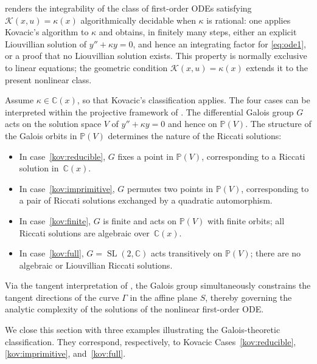 \documentclass[preprint,a4paper]{elsarticle}
\begin{document}
\begin{remark}\label{rem:decidability}
 renders the integrability of the class of first-order ODEs satisfying $\mathcal{K}(x,u)=\kappa(x)$ algorithmically decidable when $\kappa$ is rational: one applies Kovacic's algorithm to $\kappa$ and obtains, in finitely many steps, either an explicit Liouvillian solution of $y''+\kappa y=0$, and hence an integrating factor for \eqref{eq:ode1}, or a proof that no Liouvillian solution exists. This property is normally exclusive to linear equations; the geometric condition $\mathcal{K}(x,u)=\kappa(x)$ extends it to the present nonlinear class.
\end{remark}


\begin{remark}\label{rem:galois_projective}
Assume $\kappa\in\mathbb{C}(x)$, so that Kovacic's classification applies.
The four cases can be interpreted within the projective framework of . The differential Galois group $G$ acts on the solution space $V$ of $y''+\kappa y=0$ and hence on $\mathbb{P}(V)$. The structure of the Galois orbits in $\mathbb{P}(V)$ determines the nature of the Riccati solutions:
\begin{itemize}
\item In case~\ref{kov:reducible}, $G$ fixes a point in $\mathbb{P}(V)$, corresponding to a Riccati solution in~$\mathbb{C}(x)$.
\item In case~\ref{kov:imprimitive}, $G$ permutes two points in $\mathbb{P}(V)$, corresponding to a pair of Riccati solutions exchanged by a quadratic automorphism.
\item In case~\ref{kov:finite}, $G$ is finite and acts on $\mathbb{P}(V)$ with finite orbits; all Riccati solutions are algebraic over~$\mathbb{C}(x)$.
\item In case~\ref{kov:full}, $G=\operatorname{SL}(2,\mathbb{C})$ acts transitively on $\mathbb{P}(V)$; there are no algebraic or Liouvillian Riccati solutions.
\end{itemize}
Via the tangent interpretation of , the Galois group simultaneously constrains the tangent directions of the curve $\Gamma$ in the affine plane $S$, thereby governing the analytic complexity of the solutions of the nonlinear first-order ODE.
\end{remark}


We close this section with three examples illustrating the Galois-theoretic classification. They correspond, respectively, to Kovacic Cases~\ref{kov:reducible}, \ref{kov:imprimitive}, and~\ref{kov:full}.
\end{document}
